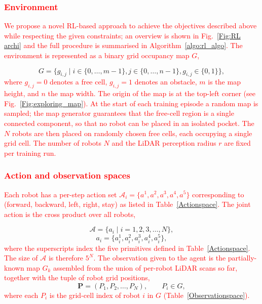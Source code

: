 \documentclass[journal]{IEEEtran}
\begin{document}
\textcolor{red}{\subsubsection{Environment} We propose a novel RL-based approach to achieve the objectives described above while respecting the given constraints; an overview is shown in Fig.~\ref{Fig:RL archi} and the full procedure is summarised in Algorithm~\ref{algo:rl_algo}. The environment is represented as a binary grid occupancy map $G$,}
\begin{equation} \label{eq:map}
G = \{ g_{i,j} \mid i \in \{0, \ldots, m{-}1\}, j \in \{0, \ldots, n{-}1\}, g_{i,j} \in \{0,1\} \},
\end{equation}
\textcolor{red}{where $g_{i,j}=0$ denotes a free cell, $g_{i,j}=1$ denotes an obstacle, $m$ is the map height, and $n$ the map width. The origin of the map is at the top-left corner (see Fig.~\ref{Fig:exploring_map}). At the start of each training episode a random map is sampled; the map generator guarantees that the free-cell region is a single connected component, so that no robot can be placed in an isolated pocket. The $N$ robots are then placed on randomly chosen free cells, each occupying a single grid cell. The number of robots $N$ and the LiDAR perception radius $r$ are fixed per training run.}

\textcolor{red}{\subsubsection{Action and observation spaces} Each robot has a per-step action set $\mathcal{A}_i = \{a^{1}, a^{2}, a^{3}, a^{4}, a^{5}\}$ corresponding to (forward, backward, left, right, stay) as listed in Table~\ref{Actionspace}. The joint action is the cross product over all robots,}
\begin{equation}
\label{eq:2}
\mathcal{A} = \{ a_i \mid i = 1, 2, 3, \ldots, N \},
\end{equation}
\begin{equation}
\label{eq:3}
a_i = \{ a_i^{1}, a_i^{2}, a_i^{3}, a_i^{4}, a_i^{5} \},
\end{equation}
\textcolor{red}{where the superscripts index the five primitives defined in Table~\ref{Actionspace}. The size of $\mathcal{A}$ is therefore $5^{N}$. The observation given to the agent is the partially-known map $G_k$ assembled from the union of per-robot LiDAR scans so far, together with the tuple of robot grid positions,}
\begin{equation}
\label{eq:4}
\mathbf{P} = (P_1, P_2, \ldots, P_N), \qquad P_i \in G,
\end{equation}
\textcolor{red}{where each $P_i$ is the grid-cell index of robot $i$ in $G$ (Table~\ref{Observationspace}).}
\end{document}
